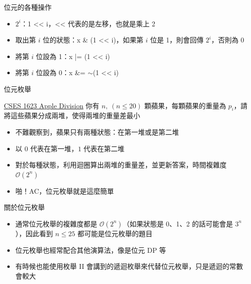 \documentclass[aspectratio=169]{beamer}
\begin{document}
    \begin{frame}{位元的各種操作}
        \begin{itemize}
            \item $2^i$：1 << i，<< 代表的是左移，也就是乘上 2
            \item 取出第 $i$ 位的狀態：x \& (1 << i)，如果第 $i$ 位是 1，則會回傳 $2^i$，否則為 $0$
            \item 將第 $i$ 位設為 1：x |= (1 << i)
            \item 將第 $i$ 位設為 0：x \&= $\sim$(1 << i)
        \end{itemize}
    \end{frame}

    \begin{frame}{位元枚舉}
        \begin{block}{\href{https://cses.fi/problemset/task/1623}{CSES 1623 Apple Division}}
            你有 $n,\ (n \le 20)$ 顆蘋果，每顆蘋果的重量為 $p_i$，請將這些蘋果分成兩堆，使得兩堆的重量差最小
        \end{block}

        \begin{itemize}
            \item<1-> 不難觀察到，蘋果只有兩種狀態：在第一堆或是第二堆
            \item<2-> 以 $0$ 代表在第一堆，$1$ 代表在第二堆
            \item<3-> 對於每種狀態，利用迴圈算出兩堆的重量差，並更新答案，時間複雜度 $\mathcal{O}(2^n)$
            \item<4-> 啪！AC，位元枚舉就是這麼簡單
        \end{itemize}
    \end{frame}

    \begin{frame}{關於位元枚舉}
        \begin{itemize}
            \item 通常位元枚舉的複雜度都是 $\mathcal{O}(2^n)$（如果狀態是 0、1、2 的話可能會是 $3^n$），因此看到 $n \le 25$ 都可能是位元枚舉的題目
            \item 位元枚舉也經常配合其他演算法，像是位元 DP 等
            \item 有時候也能使用枚舉 II 會講到的遞迴枚舉來代替位元枚舉，只是遞迴的常數會較大
        \end{itemize}
    \end{frame}
\end{document}
